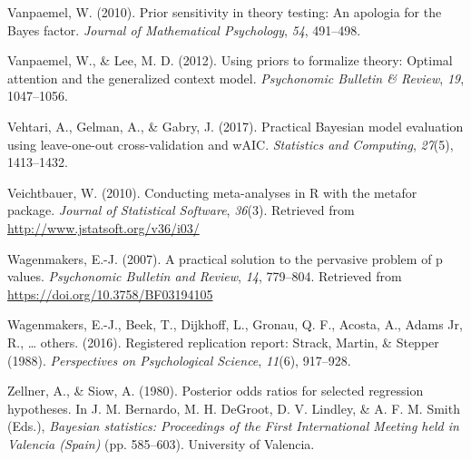 \documentclass[english,man]{apa6}
\theoremstyle{definition}
\theoremstyle{definition}
\theoremstyle{remark}
\begin{document}
\hypertarget{ref-Vanpaemel:2010}{}
Vanpaemel, W. (2010). Prior sensitivity in theory testing: An apologia
for the Bayes factor. \emph{Journal of Mathematical Psychology},
\emph{54}, 491--498.

\hypertarget{ref-Vanpaemel:Lee:2012}{}
Vanpaemel, W., \& Lee, M. D. (2012). Using priors to formalize theory:
Optimal attention and the generalized context model. \emph{Psychonomic
Bulletin \& Review}, \emph{19}, 1047--1056.

\hypertarget{ref-Vehtari:etal:2017}{}
Vehtari, A., Gelman, A., \& Gabry, J. (2017). Practical Bayesian model
evaluation using leave-one-out cross-validation and wAIC.
\emph{Statistics and Computing}, \emph{27}(5), 1413--1432.

\hypertarget{ref-Veichtbauer:2010}{}
Veichtbauer, W. (2010). Conducting meta-analyses in R with the metafor
package. \emph{Journal of Statistical Software}, \emph{36}(3). Retrieved
from \url{http://www.jstatsoft.org/v36/i03/}

\hypertarget{ref-Wagenmakers:2007}{}
Wagenmakers, E.-J. (2007). A practical solution to the pervasive problem
of p values. \emph{Psychonomic Bulletin and Review}, \emph{14},
779--804. Retrieved from \url{https://doi.org/10.3758/BF03194105}

\hypertarget{ref-Wagenmakers:etal:2016}{}
Wagenmakers, E.-J., Beek, T., Dijkhoff, L., Gronau, Q. F., Acosta, A.,
Adams Jr, R., \ldots{} others. (2016). Registered replication report:
Strack, Martin, \& Stepper (1988). \emph{Perspectives on Psychological
Science}, \emph{11}(6), 917--928.

\hypertarget{ref-Zellner:Siow:1980}{}
Zellner, A., \& Siow, A. (1980). Posterior odds ratios for selected
regression hypotheses. In J. M. Bernardo, M. H. DeGroot, D. V. Lindley,
\& A. F. M. Smith (Eds.), \emph{Bayesian statistics: Proceedings of the
First International Meeting held in Valencia (Spain)} (pp. 585--603).
University of Valencia.
\end{document}
